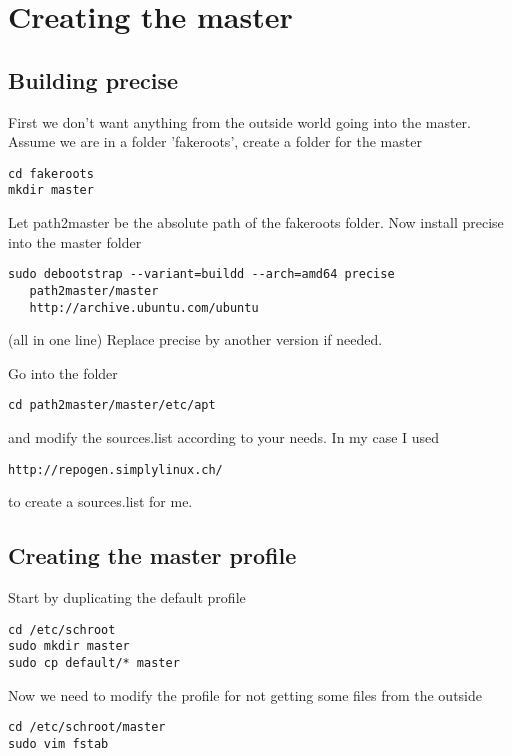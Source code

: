 \documentclass[a4paper]{book}
\begin{document}
\section{Creating the master}
\subsection{Building precise}
First we don't want anything from the outside world going into the master.
Assume we are in a folder 'fakeroots', create a folder for the master

\begin{verbatim}
cd fakeroots
mkdir master
\end{verbatim}

Let path2master be the absolute path of the fakeroots folder.
Now install precise into the master folder

\begin{verbatim}
sudo debootstrap --variant=buildd --arch=amd64 precise 
   path2master/master 
   http://archive.ubuntu.com/ubuntu
\end{verbatim}

(all in one line)
Replace precise by another version if needed.

Go into the folder

\begin{verbatim}
cd path2master/master/etc/apt
\end{verbatim}

and modify the sources.list according to your needs. In my case I used

\begin{verbatim}
http://repogen.simplylinux.ch/
\end{verbatim}

to create a sources.list for me.
\subsection{Creating the master profile}

Start by duplicating the default profile

\begin{verbatim}
cd /etc/schroot
sudo mkdir master
sudo cp default/* master
\end{verbatim}

Now we need to modify the profile for not getting some files from the outside

\begin{verbatim}
cd /etc/schroot/master
sudo vim fstab
\end{verbatim}
\end{document}
